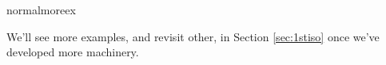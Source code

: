 \begin{examples}{}{normalmoreex}
\begin{enumerate}
		
	\end{enumerate}
\end{examples}

We'll see more examples, and revisit other, in Section \ref{sec:1stiso} once we've developed more machinery.


\goodbreak


